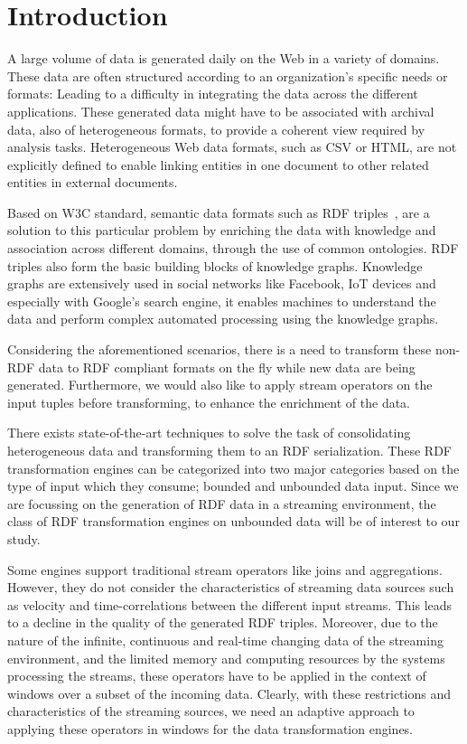 \chapter{Introduction}
\label{chap:intro}

A large volume of data is generated daily on the Web in a variety of domains. These
data are often structured according to an organization's specific needs or formats: Leading to
a difficulty in integrating the data across the different applications.
These generated data might have to be associated with archival data, also of heterogeneous formats,
to provide a coherent view required by analysis tasks. Heterogeneous Web data formats, such as CSV or HTML, are not explicitly
defined to enable linking entities in one document to other related entities in external documents.

Based on W3C standard, semantic data formats such as RDF triples~\cite{intro_rdf}, are a solution to
this particular problem by enriching the data with knowledge and association across
different domains, through the use of common ontologies. RDF triples also form the basic building blocks of knowledge graphs.
Knowledge graphs are extensively used in social networks like Facebook\cite{facebook_linked_data}, IoT devices\cite{graph_of_things} and especially with Google's search
engine\cite{google_kg}, it enables machines to understand the data and perform complex automated processing
using the knowledge graphs. 

Considering the aforementioned scenarios, there is a need to transform these non-RDF data to RDF compliant formats on the fly while
new data are being generated. Furthermore, we would also like to apply stream operators on the input tuples
before transforming, to enhance the enrichment of the data.

There exists state-of-the-art techniques to solve the task of consolidating heterogeneous data
and transforming them to an RDF serialization. These RDF transformation engines can be categorized into two major categories based on the type of input
which they consume; bounded and unbounded data input. Since we are focussing on the generation of RDF data
in a streaming environment, the class of RDF transformation engines on unbounded data will be of interest to our study.

Some engines support traditional stream operators like joins and aggregations. However, they do not consider
the characteristics of streaming data sources such as velocity and time-correlations between the different
input streams. This leads to a decline in the quality of the generated RDF triples. Moreover,
due to the nature of the infinite, continuous and real-time changing data of the streaming environment, and 
the limited memory and computing resources by the systems processing the streams, 
these operators have to be applied in the context of windows over a subset of the incoming data.
Clearly, with these restrictions and characteristics of the streaming sources, we need an adaptive approach
to applying these operators in windows for the data transformation engines. 

